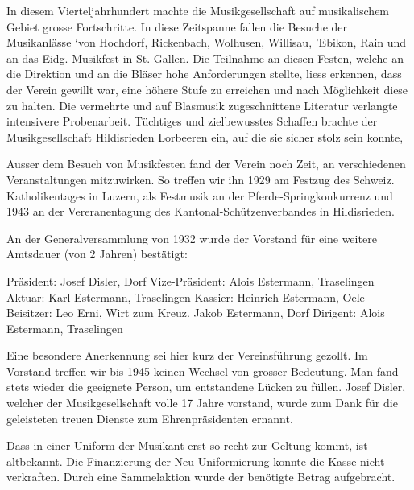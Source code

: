 \begin{multicols}{2}


    In diesem Vierteljahrhundert machte die Musikgesellschaft auf musikalischem
    Gebiet grosse Fortschritte. In diese Zeitspanne fallen die Besuche der
    Musikanlässe ‘von Hochdorf, Rickenbach, Wolhusen, Willisau, 'Ebikon, Rain
    und an das Eidg. Musikfest in St. Gallen. Die Teilnahme an diesen Festen,
    welche an die Direktion und an die Bläser hohe Anforderungen stellte, liess
    erkennen, dass der Verein gewillt war, eine höhere Stufe zu erreichen und
    nach Möglichkeit diese zu halten. Die vermehrte und auf Blasmusik
    zugeschnittene Literatur verlangte intensivere Probenarbeit. Tüchtiges und
    zielbewusstes Schaffen brachte der Musikgesellschaft Hildisrieden Lorbeeren
    ein, auf die sie sicher stolz sein konnte,

    Ausser dem Besuch von Musikfesten fand der Verein noch Zeit, an
    verschiedenen Veranstaltungen mitzuwirken. So treffen wir ihn 1929 am
    Festzug des Schweiz. Katholikentages in Luzern, als Festmusik an der
    Pferde-Springkonkurrenz und 1943 an der Vereranentagung des
    Kantonal-Schützenverbandes in Hildisrieden.

    An der Generalversammlung von 1932 wurde der Vorstand für eine weitere
    Amtsdauer (von 2 Jahren) bestätigt:

    Präsident: Josef Disler, Dorf Vize-Präsident: Alois Estermann, Traselingen
    Aktuar: Karl Estermann, Traselingen Kassier: Heinrich Estermann, Oele
    Beisitzer: Leo Erni, Wirt zum Kreuz. Jakob Estermann, Dorf Dirigent: Alois
    Estermann, Traselingen


    Eine besondere Anerkennung sei hier kurz der Vereinsführung gezollt. Im
    Vorstand treffen wir bis 1945 keinen Wechsel von grosser Bedeutung. Man fand
    stets wieder die geeignete Person, um entstandene Lücken zu füllen. Josef
    Disler, welcher der Musikgesellschaft volle 17 Jahre vorstand, wurde zum
    Dank für die geleisteten treuen Dienste zum Ehrenpräsidenten ernannt.

    Dass in einer Uniform der Musikant erst so recht zur Geltung kommt, ist
    altbekannt. Die Finanzierung der Neu-Uniformierung konnte die Kasse nicht
    verkraften. Durch eine Sammelaktion wurde der benötigte Betrag aufgebracht.


\end{multicols}
